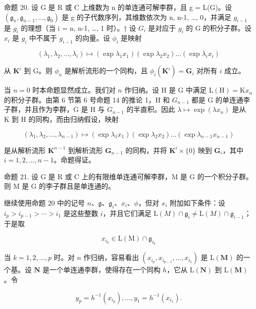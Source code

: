 命题 20. 设 G 是 R 或 C 上维数为 n 的单连通可解李群，且 g = L(G)。设 \((\mathfrak{g}_{n}, \mathfrak{g}_{n-1}, \ldots, \mathfrak{g}_{0})\) 是 g 的子代数序列，其维数依次为 n, n-1, \ldots, 0，并满足 \(g_{i-1}\) 是 \(g_{i}\) 的理想（当 i = n, n-1, \ldots, 1 时）。† 设 \(G_{i}\) 是对应于 \(g_{i}\) 的 G 的积分子群。设 \(x_{i}\) 是 \(g_{i}\) 中不属于 \(g_{i-1}\) 的向量。设 \(\phi_{i}\) 是映射

\[
\left(\lambda_ {1}, \lambda_ {2}, \dots , \lambda_ {i}\right) \mapsto \left(\exp \lambda_ {1} x _ {1}\right) \left(\exp \lambda_ {2} x _ {2}\right) \dots \left(\exp \lambda_ {i} x _ {i}\right)
\]

从 \(\mathbf{K}^i\) 到 G。则 \(\phi_n\) 是解析流形的一个同构，且 \(\phi_i(\mathbf{K}^i) = \mathbf{G}_i\) 对所有 \(i\) 成立。

当 \(n = 0\) 时本命题显然成立。我们对 \(n\) 作归纳。设 H 是 G 中满足 \(\mathrm{L(H)} = \mathrm{K}x_n\) 的积分子群。由第 6 节第 6 号命题 14 的推论 1，H 和 \(G_{n-1}\) 都是 G 的单连通李子群，并且作为李群，G 是 H 与 \(G_{n-1}\) 的半直积。因此 \(\lambda \mapsto \exp (\lambda x_n)\) 是从 K 到 H 的同构，而由归纳假设，映射

\[
\left(\lambda_ {1}, \lambda_ {2}, \dots , \lambda_ {n - 1}\right) \mapsto \left(\exp \lambda_ {1} x _ {1}\right) \left(\exp \lambda_ {2} x _ {2}\right) \dots \left(\exp \lambda_ {n - 1} x _ {n - 1}\right)
\]

是从解析流形 \(\mathbf{K}^{n - 1}\) 到解析流形 \(\mathbf{G}_{n - 1}\) 的同构，并将 \(\mathbf{K}^i\times \{0\}\) 映到 \(\mathbf{G}_i\)，其中 \(i = 1,2,\ldots ,n - 1\)。命题得证。

命题 21. 设 G 是 R 或 C 上的有限维单连通可解李群，M 是 G 的一个积分子群。则 M 是 G 的李子群且是单连通的。

继续使用命题 20 中的记号 \(n\)、\(\mathfrak{g}\)、\(\mathfrak{g}_{i}\)、\(x_{i}\)、\(\phi\)，但对 \(x_{i}\) 附加如下条件：设 \(i_{p} > i_{p-1} > \cdots > i_{1}\) 是这些整数 \(i\)，并且它们满足 \(\mathrm{L}(M) \cap \mathfrak{g}_{i} \neq \mathrm{L}(M) \cap \mathfrak{g}_{i-1}\)；于是取

\[
x _ {i _ {k}} \in \mathrm{L} (\mathrm{M}) \cap \mathfrak {g} _ {i _ {k}}
\]

当 \(k = 1, 2, \ldots, p\) 时。对 \(n\) 作归纳，容易看出 \((x_{i_p}, x_{i_{p-1}}, \ldots, x_{i_1})\) 是 \(\mathrm{L}(\mathbf{M})\) 的一个基。设 \(\mathbf{N}\) 是一个单连通李群，使得存在一个同构 \(h\)，它从 \(\mathrm{L}(\mathbf{N})\) 到 \(\mathrm{L}(\mathbf{M})\)。令

\[
y _ {p} = h ^ {- 1} (x _ {i _ {p}}), \dots , y _ {1} = h ^ {- 1} (x _ {i _ {1}}).
\]


